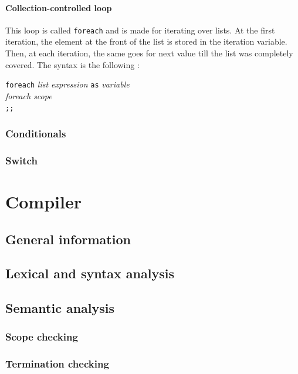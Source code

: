\documentclass[a4paper,11pt]{article}
\begin{document}
\paragraph{Collection-controlled loop} This loop is called \texttt{foreach} and is made for iterating over lists. At the first iteration, the element at the front of the list is stored in the iteration variable. Then, at each iteration, the same goes for next value till the list was completely covered. The syntax is the following :
\begin{center}
	\begin{minipage}{0.35\linewidth}
		\texttt{foreach} \textit{list expression} \texttt{as} \textit{variable} \\
				\text{ }\text{ }\text{ }\text{ }\textit{foreach scope}\\
		\texttt{;;}\\
	\end{minipage}
\end{center}
\subsubsection{Conditionals}
\subsubsection{Switch}
\section{Compiler}
\label{sec:compiler}
\subsection{General information}
\subsection{Lexical and syntax analysis}
\subsection{Semantic analysis}
\subsubsection{Scope checking}
\subsubsection{Termination checking}
\end{document}
